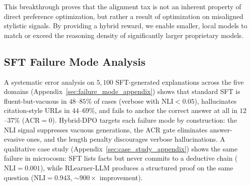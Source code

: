 \begin{table}[h]
\centering
{}
\caption{Blind Pairwise evaluation results vs. GPT-4o-mini.}
\label{tab:pairwise_1}
\end{table}

This breakthrough proves that the alignment tax is not an inherent property of direct preference optimization, but rather a result of optimization on misaligned stylistic signals. By providing a hybrid reward, we enable smaller, local models to match or exceed the reasoning density of significantly larger proprietary models.

\subsection{SFT Failure Mode Analysis}
A systematic error analysis on $5{,}100$ SFT-generated explanations across the five domains (Appendix~\ref{sec:failure_mode_appendix}) shows that standard SFT is fluent-but-vacuous in $48$--$85\%$ of cases (verbose with $\mathrm{NLI}{<}0.05$), hallucinates citation-style URLs in $44$--$69\%$, and fails to anchor the correct answer at all in $12$--$37\%$ ($\mathrm{ACR}{=}0$). Hybrid-DPO targets each failure mode by construction: the NLI signal suppresses vacuous generations, the ACR gate eliminates answer-evasive ones, and the length penalty discourages verbose hallucinations. A qualitative case study (Appendix~\ref{sec:case_study_appendix}) shows the same failure in microcosm: SFT lists facts but never commits to a deductive chain ($\mathrm{NLI}{=}0.001$), while RLearner-LLM produces a structured proof on the same question ($\mathrm{NLI}{=}0.943$, $\sim 900\times$ improvement).
